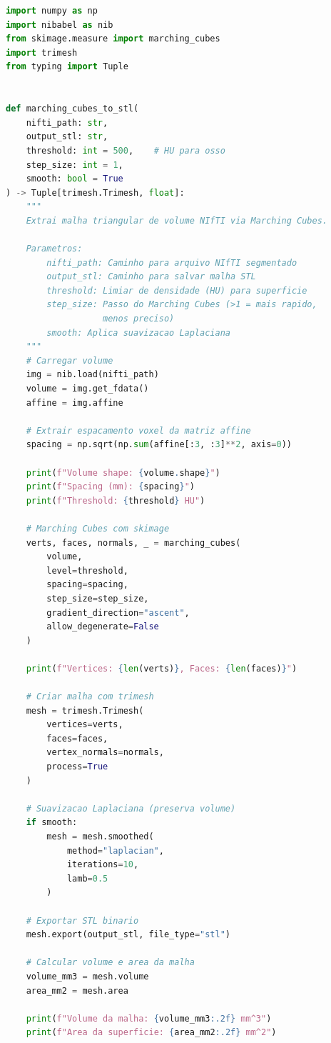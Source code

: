 \begin{lstlisting}[language=Python, caption=Pipeline completo Marching Cubes + exportacao STL, label=code:marching-cubes]
import numpy as np
import nibabel as nib
from skimage.measure import marching_cubes
import trimesh
from typing import Tuple


def marching_cubes_to_stl(
    nifti_path: str,
    output_stl: str,
    threshold: int = 500,    # HU para osso
    step_size: int = 1,
    smooth: bool = True
) -> Tuple[trimesh.Trimesh, float]:
    """
    Extrai malha triangular de volume NIfTI via Marching Cubes.

    Parametros:
        nifti_path: Caminho para arquivo NIfTI segmentado
        output_stl: Caminho para salvar malha STL
        threshold: Limiar de densidade (HU) para superficie
        step_size: Passo do Marching Cubes (>1 = mais rapido,
                   menos preciso)
        smooth: Aplica suavizacao Laplaciana
    """
    # Carregar volume
    img = nib.load(nifti_path)
    volume = img.get_fdata()
    affine = img.affine

    # Extrair espacamento voxel da matriz affine
    spacing = np.sqrt(np.sum(affine[:3, :3]**2, axis=0))

    print(f"Volume shape: {volume.shape}")
    print(f"Spacing (mm): {spacing}")
    print(f"Threshold: {threshold} HU")

    # Marching Cubes com skimage
    verts, faces, normals, _ = marching_cubes(
        volume,
        level=threshold,
        spacing=spacing,
        step_size=step_size,
        gradient_direction="ascent",
        allow_degenerate=False
    )

    print(f"Vertices: {len(verts)}, Faces: {len(faces)}")

    # Criar malha com trimesh
    mesh = trimesh.Trimesh(
        vertices=verts,
        faces=faces,
        vertex_normals=normals,
        process=True
    )

    # Suavizacao Laplaciana (preserva volume)
    if smooth:
        mesh = mesh.smoothed(
            method="laplacian",
            iterations=10,
            lamb=0.5
        )

    # Exportar STL binario
    mesh.export(output_stl, file_type="stl")

    # Calcular volume e area da malha
    volume_mm3 = mesh.volume
    area_mm2 = mesh.area

    print(f"Volume da malha: {volume_mm3:.2f} mm^3")
    print(f"Area da superficie: {area_mm2:.2f} mm^2")


\end{lstlisting}
